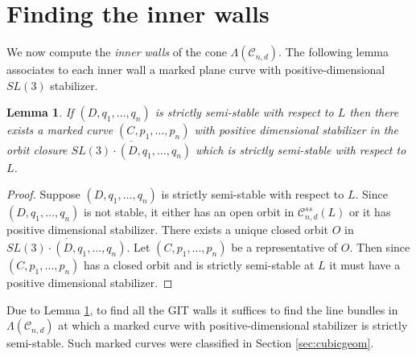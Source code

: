 \documentclass{amsart}
\newcommand{\mc}{\mathcal}
\numberwithin{equation}{section}
\newtheorem{lemma}[prop]{Lemma}
\theoremstyle{definition}
\begin{document}





\section{Finding the inner walls} \label{sec:innerwalls}

We now compute the \textit{inner walls} of the cone $\Lambda(\mc{C}_{n,d})$. The following lemma associates to each inner wall a marked plane curve with positive-dimensional $SL(3)$ stabilizer.

\begin{lemma}\label{lemma:stab}
    If $(D, q_1, \dots , q_n)$ is strictly semi-stable with respect to $L$ then there exists a marked curve $(C, p_1, \dots , p_n)$ with positive dimensional stabilizer in the orbit closure $\overline{SL(3) \cdot (D, q_1, \dots , q_n)}$ which is strictly semi-stable with respect to $L$. 
\end{lemma}

\begin{proof}
Suppose $(D, q_1, \dots , q_n)$ is strictly semi-stable with respect to $L$. Since $(D, q_1, \dots , q_n)$ is not stable, it either has an open orbit in $\mc{C}_{n,d}^{ss}(L)$ or it has positive dimensional stabilizer. There exists a unique closed orbit $O$ in $\overline{SL(3) \cdot (D, q_1, \dots , q_n)}$. Let $(C, p_1, \dots , p_n)$ be a representative of $O$. Then since $(C, p_1, \dots , p_n)$ has a closed orbit and is strictly semi-stable at $L$ it must have a positive dimensional stabilizer.
\end{proof}


Due to Lemma \ref{lemma:stab}, to find all the GIT walls it suffices to find the line bundles in $\Lambda(\mc{C}_{n,d})$ at which a marked curve with positive-dimensional stabilizer is strictly semi-stable. Such marked curves were classified in Section \ref{sec:cubicgeom}.
\end{document}
